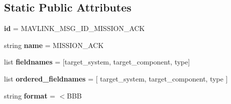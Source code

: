 \subsection*{Static Public Attributes}
\begin{DoxyCompactItemize}
\item 
\mbox{\label{classpymavlink_1_1dialects_1_1v10_1_1MAVLink__mission__ack__message_a4b18feb52f9318ed4e84a9d8fd12b93d}} 
{\bfseries id} = M\+A\+V\+L\+I\+N\+K\+\_\+\+M\+S\+G\+\_\+\+I\+D\+\_\+\+M\+I\+S\+S\+I\+O\+N\+\_\+\+A\+CK
\item 
\mbox{\label{classpymavlink_1_1dialects_1_1v10_1_1MAVLink__mission__ack__message_a98fc0b4c170d35641d8b800fd1dadaee}} 
string {\bfseries name} = \textquotesingle{}M\+I\+S\+S\+I\+O\+N\+\_\+\+A\+CK\textquotesingle{}
\item 
\mbox{\label{classpymavlink_1_1dialects_1_1v10_1_1MAVLink__mission__ack__message_a78368264cdcf2fe1f4481fc78a2c1f94}} 
list {\bfseries fieldnames} = \mbox{[}\textquotesingle{}target\+\_\+system\textquotesingle{}, \textquotesingle{}target\+\_\+component\textquotesingle{}, \textquotesingle{}type\textquotesingle{}\mbox{]}
\item 
\mbox{\label{classpymavlink_1_1dialects_1_1v10_1_1MAVLink__mission__ack__message_a7249e3a1a4d60d348ffddd6f62729491}} 
list {\bfseries ordered\+\_\+fieldnames} = \mbox{[} \textquotesingle{}target\+\_\+system\textquotesingle{}, \textquotesingle{}target\+\_\+component\textquotesingle{}, \textquotesingle{}type\textquotesingle{} \mbox{]}
\item 
\mbox{\label{classpymavlink_1_1dialects_1_1v10_1_1MAVLink__mission__ack__message_a48ea4a16c37c8ee785669bb1c1544c1c}} 
string {\bfseries format} = \textquotesingle{}$<$B\+BB\textquotesingle{}
\item 
\mbox{\label{classpymavlink_1_1dialects_1_1v10_1_1MAVLink__mission__ack__message_abae747b3aaef8a19c54420216c97278a}} 

\end{DoxyCompactItemize}
